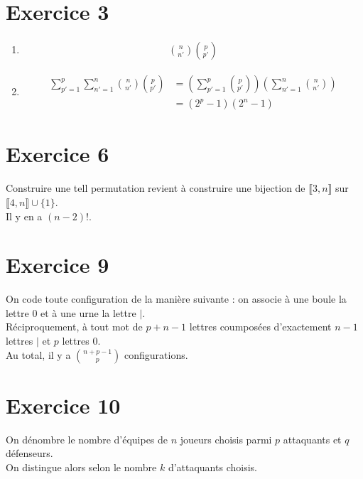 \documentclass[../main.tex]{subfiles}
\begin{document}
\section*{Exercice 3}
\begin{enumerate}
    \item \begin{align*}
        \binom{n}{n'} \binom{p}{p'}
    \end{align*}
    \item \begin{align*}
        \sum_{p'=1}^{p} \sum_{n'=1}^{n} \binom{n}{n'} \binom{p}{p'} &= \left( \sum_{p'=1}^{p} \binom{p}{p'} \right) \left( \sum_{n'=1}^{n} \binom{n}{n'} \right) \\
        &= (2^p-1)(2^n-1)
    \end{align*}
\end{enumerate}

\section*{Exercice 6}
\noindent Construire une tell permutation revient à construire une bijection de $\llbracket 3, n \rrbracket$ sur $\llbracket 4, n \rrbracket \cup \{1\}$. \\
Il y en a $(n-2)!$. 

\section*{Exercice 9}
\noindent On code toute configuration de la manière suivante : on associe à une boule la lettre $0$ et à une urne la lettre $|$. \\
Réciproquement, à tout mot de $p+n-1$ lettres coumposées d'exactement $n-1$ lettres $|$ et $p$ lettres $0$. \\
Au total, il y a $\binom{n+p-1}{p}$ configurations. 

\section*{Exercice 10}
\noindent On dénombre le nombre d'équipes de $n$ joueurs choisis parmi $p$ attaquants et $q$ défenseurs. \\
On distingue alors selon le nombre $k$ d'attaquants choisis. 
\end{document}
